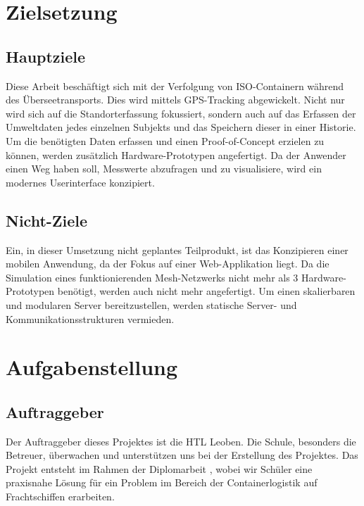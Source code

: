 \documentclass[
    headings=optiontotocandhead,%
    twoside,
    numbers=noenddot,%
    12pt, %
    titlepage, %
    parskip=full, %
    listof=leveldown, 
    numbers=noenddot, %
    a4paper,DIV=14,
    BCOR=15mm,
]{scrbook}
\makeatletter
\newcommand*{\the@orig@section}{}
\let\the@orig@section\section
\renewcommand*{\section}{%
  \clearpage
  \the@orig@section
}
\makeatother
\begin{document}
\hypertarget{zielsetzung}{%
\section{Zielsetzung}\label{zielsetzung}}

\hypertarget{hauptziele}{%
\subsection{Hauptziele}\label{hauptziele}}

Diese Arbeit beschäftigt sich mit der Verfolgung von ISO-Containern
während des Überseetransports. Dies wird mittels GPS-Tracking
abgewickelt. Nicht nur wird sich auf die Standorterfassung fokussiert,
sondern auch auf das Erfassen der Umweltdaten jedes einzelnen Subjekts
und das Speichern dieser in einer Historie. Um die benötigten Daten
erfassen und einen Proof-of-Concept erzielen zu können, werden
zusätzlich Hardware-Prototypen angefertigt. Da der Anwender einen Weg
haben soll, Messwerte abzufragen und zu visualisiere, wird ein modernes
Userinterface konzipiert.

\hypertarget{nicht-ziele}{%
\subsection{Nicht-Ziele}\label{nicht-ziele}}

Ein, in dieser Umsetzung nicht geplantes Teilprodukt, ist das
Konzipieren einer mobilen Anwendung, da der Fokus auf einer
Web-Applikation liegt. Da die Simulation eines funktionierenden
Mesh-Netzwerks nicht mehr als 3 Hardware-Prototypen benötigt, werden
auch nicht mehr angefertigt. Um einen skalierbaren und modularen Server
bereitzustellen, werden statische Server- und Kommunikationsstrukturen
vermieden.

\hypertarget{aufgabenstellung}{%
\section{Aufgabenstellung}\label{aufgabenstellung}}

\hypertarget{auftraggeber}{%
\subsection{Auftraggeber}\label{auftraggeber}}

Der Auftraggeber dieses Projektes ist die HTL Leoben. Die Schule,
besonders die Betreuer, überwachen und unterstützen uns bei der
Erstellung des Projektes. Das Projekt entsteht im Rahmen der
Diplomarbeit , wobei wir Schüler eine praxisnahe Lösung für ein Problem
im Bereich der Containerlogistik auf Frachtschiffen erarbeiten.
\end{document}
